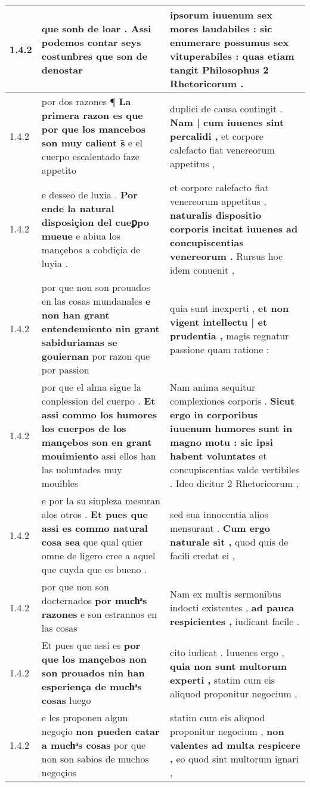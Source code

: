 \begin{tabular}{|p{1cm}|p{6.5cm}|p{6.5cm}|}
1.4.2 & que sonb de loar . \textbf{ Assi podemos contar seys costunbres } que son de denostar & ipsorum iuuenum sex mores laudabiles : \textbf{ sic enumerare possumus sex vituperabiles : } quas etiam tangit Philosophus 2 Rhetoricorum . \\\hline
1.4.2 & por dos razones ¶ \textbf{ La primera razon es que por que los mancebos son muy calient s̃ } e el cuerpo escalentado faze appetito & duplici de causa contingit . \textbf{ Nam | cum iuuenes sint percalidi , } et corpore calefacto fiat venereorum appetitus , \\\hline
1.4.2 & e desseo de luxia . \textbf{ Por ende la natural disposiçion del cueꝑpo mueue } e abiua los mançebos a cobdiçia de luyia . & et corpore calefacto fiat venereorum appetitus , \textbf{ naturalis dispositio corporis incitat iuuenes ad concupiscentias venereorum . } Rursus hoc idem conuenit , \\\hline
1.4.2 & por que non son prouados en las cosas mundanales \textbf{ e non han grant entendemiento nin grant sabiduriamas se gouiernan } por razon que por passion & quia sunt inexperti , \textbf{ et non vigent intellectu | et prudentia , } magis regnatur passione quam ratione : \\\hline
1.4.2 & por que el alma sigue la conplession del cuerpo . \textbf{ Et assi commo los humores los cuerpos de los mançebos son en grant mouimiento } assi ellos han las uoluntades muy mouibles & Nam anima sequitur complexiones corporis . \textbf{ Sicut ergo in corporibus iuuenum humores sunt in magno motu : sic ipsi habent voluntates } et concupiscentias valde vertibiles . Ideo dicitur 2 Rhetoricorum , \\\hline
1.4.2 & e por la su sinpleza mesuran alos otros . \textbf{ Et pues que assi es commo natural cosa sea } que qual quier omne de ligero cree a aquel que cuyda que es bueno . & sed sua innocentia alios mensurant . \textbf{ Cum ergo naturale sit , } quod quis de facili credat ei , \\\hline
1.4.2 & por que non son docternados \textbf{ por muchͣs razones } e son estrannos en las cosas & Nam ex multis sermonibus indocti existentes , \textbf{ ad pauca respicientes , } iudicant facile . \\\hline
1.4.2 & Et pues que assi es \textbf{ por que los mançebos non son prouados nin han esperiença de muchͣs cosas } luego & cito iudicat . Iuuenes ergo , \textbf{ quia non sunt multorum experti , } statim cum eis aliquod proponitur negocium , \\\hline
1.4.2 & e les proponen algun negoçio \textbf{ non pueden catar a muchͣs cosas } por que non son sabios de muchos negoçios & statim cum eis aliquod proponitur negocium , \textbf{ non valentes ad multa respicere , } eo quod sint multorum ignari , \\\hline

\end{tabular}

